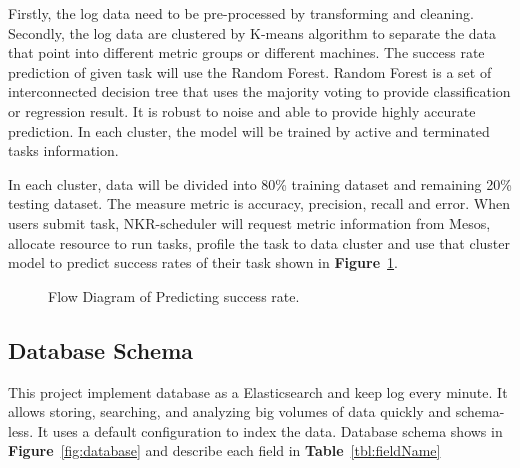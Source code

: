 \documentclass[12pt,oneside,openright,a4paper]{cpe-english-project}
\begin{document}
\begin{enumerate}
\hspace{10mm}Firstly, the log data need to be pre-processed by transforming and cleaning.  Secondly, the log data are clustered by K-means algorithm to separate the data that point into different metric groups or different machines.  The success rate prediction of given task will use the Random Forest. Random Forest is a set of interconnected decision tree that uses the majority voting to provide classification or regression result. It is robust to noise and able to provide highly accurate prediction. \cite{adaptiveScheduling} In each cluster, the model will be trained by active and terminated tasks information. 

\hspace{10mm}In each cluster, data will be divided into 80\% training dataset and remaining 20\% testing dataset. The measure metric is accuracy, precision, recall and error. When users submit task, NKR-scheduler will request metric information from Mesos, allocate resource to run tasks, profile the task to data cluster and use that cluster model to predict success rates of their task shown in \textbf{Figure}~\ref{fig:flowDiagramPredict}.

  \begin{figure}[!h]\centering
    \setlength{\fboxrule}{0mm} %
    \setlength{\fboxsep}{0cm}
    \caption{Flow Diagram of Predicting success rate.}\label{fig:flowDiagramPredict}
  \end{figure}

\end{enumerate}

\newpage

\subsection{Database Schema}  

\hspace{10mm}This project implement database as a Elasticsearch and keep log every minute. It allows storing, searching, and analyzing big volumes of data quickly and schema-less. It uses a default configuration to index the data. Database schema shows in \textbf{Figure}~\ref{fig:database} and describe each field in \textbf{Table}~\ref{tbl:fieldName}
\end{document}
